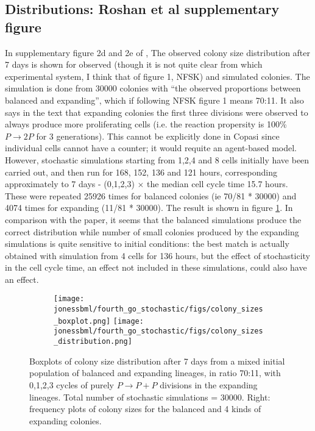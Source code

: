 \documentclass[a4paper,10pt]{report}
\newcommand{\psortbase}{/home/ngrs2/work/bsu/PSORT_Zuliani_Reynolds/}
\newcommand{\sbmlbase}{\psortbase/sbml-sh/}
\newcommand{\jonessbml}{\sbmlbase/jones_like}
\begin{document}
\subsection{Distributions: Roshan et al supplementary figure}

In supplementary figure 2d and 2e of \cite{roshan2016human}, The observed colony size distribution after 7 days is shown for observed (though it is not quite clear from which experimental system, I think that of figure 1, NFSK) and simulated colonies. The simulation is done from 30000 colonies with ``the observed proportions between balanced and expanding'', which if following NFSK figure 1 means 70:11. It also says in the text that expanding colonies the first three divisions were observed to always produce more proliferating cells (i.e. the reaction propersity is 100\% $P \rightarrow 2 P$ for 3 generations). This cannot be explicitly done in Copasi since individual cells cannot have a counter; it would requite an agent-based model. However, stochastic simulations starting from 1,2,4 and 8 cells initially have been carried out, and then run for 168, 152, 136 and 121 hours, corresponding approximately to 7 days - (0,1,2,3) $\times$ the median cell cycle time 15.7 hours.
These were repeated 25926 times for balanced colonies (ie 70/81 * 30000) and 4074 times for expanding (11/81 * 30000). The result is shown in figure  \ref{fig:joneslike_sim_mixedlineages}. In comparison with the paper, it seems that
the balanced simulations produce the correct distribution while number of small colonies produced by the expanding simulations is quite sensitive to initial conditions: the best match is actually obtained with simulation from 4 cells for 136 hours, but the effect of stochasticity in the cell cycle time, an effect not included in these simulations, could also have an effect. 


\begin{figure}[h!]
  \centering
  \begin{subfigure}{\textwidth}
    \texttt{[image: \\jonessbml/fourth\_go\_stochastic/figs/colony\_sizes\_boxplot.png]}
    \texttt{[image: \\jonessbml/fourth\_go\_stochastic/figs/colony\_sizes\_distribution.png]}
  \end{subfigure}
  \caption{Boxplots of colony size distribution after 7 days from a mixed initial population of balanced and expanding lineages, in ratio 70:11, with 0,1,2,3 cycles of purely $P \rightarrow P+P$ divisions in the expanding lineages. Total number of stochastic simulations = 30000. Right: frequency plots of colony sizes for the balanced and 4 kinds of expanding colonies.}
  \label{fig:joneslike_sim_mixedlineages}
\end{figure}
\end{document}
